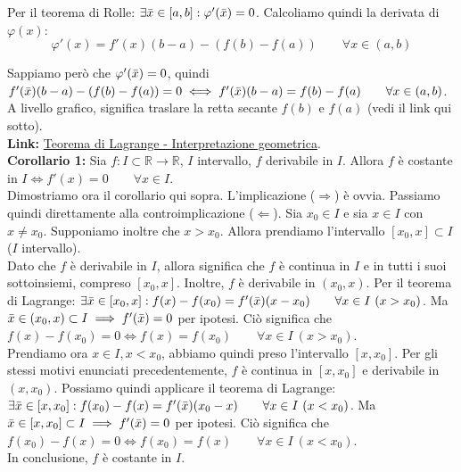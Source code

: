 \documentclass{article}
\begin{document}
\noindent Per il teorema di Rolle: $\exists \Bar{x} \in [a, b] : \varphi'(\Bar{x}) = 0$. Calcoliamo quindi la derivata di $\varphi(x)$:
\begin{equation*}
    \varphi'(x) = f'(x)(b - a) - (f(b) - f(a)) \qquad \forall x \in (a, b)
\end{equation*}

\noindent Sappiamo però che $\varphi'(\Bar{x}) = 0$, quindi $f'(\Bar{x})(b - a) - (f(b) - f(a)) = 0 \iff f'(\Bar{x})(b - a) = f(b) - f(a) \qquad \forall x \in (a, b)$. A livello grafico, significa traslare la retta secante $f(b)$ e $f(a)$ (vedi il link qui sotto). \\

\noindent\textbf{Link:} \href{https://www.geogebra.org/m/z9y24ehK}{Teorema di Lagrange - Interpretazione geometrica}.\\

\noindent\textbf{Corollario 1:} Sia $f: I \subset \mathbb{R} \xrightarrow{} \mathbb{R}$, $I$ intervallo, $f$ derivabile in $I$. Allora $f$ è costante in $I \iff f'(x) = 0 \qquad \forall x \in I$.\\

\noindent Dimostriamo ora il corollario qui sopra. L'implicazione ($\Rightarrow$) è ovvia. Passiamo quindi direttamente alla controimplicazione ($\Leftarrow$). Sia $x_0 \in I$ e sia $x \in I$ con $x \neq x_0$. Supponiamo inoltre che $x > x_0$. Allora prendiamo l'intervallo $[x_0, x] \subset I$ ($I$ intervallo).\\
Dato che $f$ è derivabile in $I$, allora significa che $f$ è continua in $I$ e in tutti i suoi sottoinsiemi, compreso $[x_0, x]$. Inoltre, $f$ è derivabile in $(x_0, x)$. Per il teorema di Lagrange: $\exists \Bar{x} \in [x_0, x] : f(x) - f(x_0) = f'(\Bar{x})(x - x_0) \qquad \forall x \in I \ (x > x_0)$. Ma $\Bar{x} \in (x_0, x) \subset I \implies f'(\Bar{x}) = 0$ per ipotesi. Ciò significa che $f(x) - f(x_0) = 0 \iff f(x) = f(x_0) \qquad \forall x \in I \ (x > x_0)$.\\
Prendiamo ora $x \in I, x < x_0$, abbiamo quindi preso l'intervallo $[x, x_0]$. Per gli stessi motivi enunciati precedentemente, $f$ è continua in $[x, x_0]$ e derivabile in $(x, x_0)$. Possiamo quindi applicare il teorema di Lagrange: $\exists \Bar{x} \in [x, x_0] : f(x_0) - f(x) = f'(\Bar{x})(x_0 - x) \qquad \forall x \in I \ (x < x_0)$. Ma $\Bar{x} \in [x, x_0] \subset I \implies f'(\Bar{x}) = 0$ per ipotesi. Ciò significa che $f(x_0) - f(x) = 0 \iff f(x_0) = f(x) \qquad \forall x \in I \ (x < x_0)$.\\
In conclusione, $f$ è costante in $I$.\\
\end{document}
